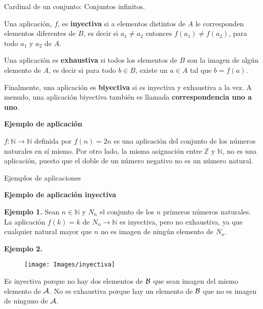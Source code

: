 \documentclass[ignorenonframetext,]{beamer}
\begin{document}
\begin{frame}{Cardinal de un conjunto: Conjuntos infinitos.}
\protect\hypertarget{cardinal-de-un-conjunto-conjuntos-infinitos.-1}{}

Una aplicación, \(f\), es \textbf{inyectiva} si a elementos distintos de
\(A\) le corresponden elementos diferentes de \(B\), es decir si
\(a_1 \neq a_2\) entonces \(f(a_1) \neq f(a_2)\), para todo \(a_1\) y
\(a_2\) de \(A\).

Una aplicación es \textbf{exhaustiva} si todos los elementos de \(B\)
son la imagen de algún elemento de \(A\), es decir si para todo
\(b \in B\), existe un \(a \in A\) tal que \(b=f(a)\).

Finalmente, una aplicación es \textbf{biyectiva} si es inyectiva y
exhaustiva a la vez. A menudo, una aplicación biyectiva también es
llamada \textbf{correspondencia uno a uno}.

\textbf{Ejemplo de aplicación}

\(f: \mathbb{N} \rightarrow \mathbb{N}\) definida por \(f(n) = 2n\) es
una aplicación del conjunto de los números naturales en sí mismo. Por
otro lado, la misma asignación entre \(\mathbb{Z}\) y \(\mathbb{N}\), no
es una aplicación, puesto que el doble de un número negativo no es un
número natural.

\end{frame}

\begin{frame}{Ejemplos de aplicaciones}
\protect\hypertarget{ejemplos-de-aplicaciones}{}

\textbf{Ejemplo de aplicación inyectiva}

\textbf{Ejemplo 1. }Sean \(n \in \mathbb{N}\) y \(N_n\) el conjunto de
los \(n\) primeros números naturales. La aplicación \(f(k)=k\) de
\(N_n \rightarrow \mathbb{N}\) es inyectiva, pero no exhaustiva, ya que
cualquier natural mayor que \(n\) no es imagen de ningún elemento de
\(N_n\).

\textbf{Ejemplo 2.}

\begin{figure}
\texttt{[image: Images/inyectiva]} \end{figure}

Es inyectiva porque no hay dos elementos de \(\cal{B}\) que sean imagen
del mismo elemento de \(\cal{A}\). No es exhaustiva porque hay un
elemento de \(\cal{B}\) que no es imagen de ninguno de \(\cal{A}\).

\end{frame}
\end{document}
